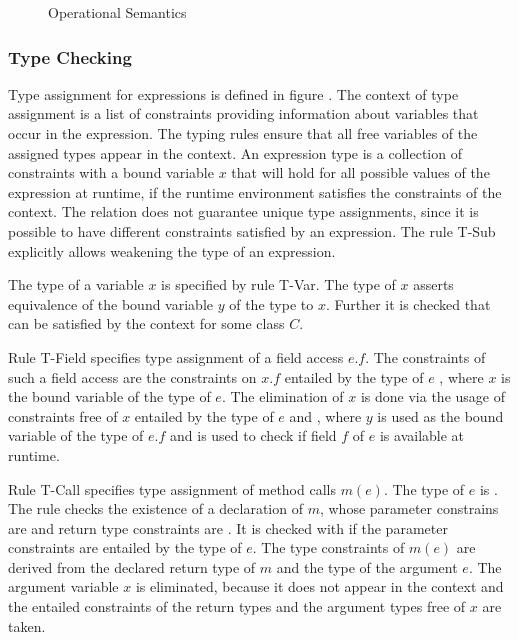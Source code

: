 \begin{figure}
\caption{Operational Semantics}
\label{fig:dcc-opsemantics}
\end{figure}

\subsubsection{Type Checking}
Type assignment for expressions is defined in figure .
The context of type assignment is a list of constraints providing information
about variables that occur in the expression.
The typing rules ensure that all free variables of the assigned types
appear in the context.
An expression type  is a collection of constraints 
with a bound variable $x$
that will hold for all possible values of the expression at runtime,
if the runtime environment satisfies the constraints of the context.
The relation does not guarantee unique type assignments,
since it is possible to have different constraints satisfied by an expression.
The rule T-Sub explicitly allows weakening the type of an expression.

The type of a variable $x$ is specified by rule T-Var.
The type of $x$ asserts equivalence of the bound variable $y$ of the type to $x$.
Further it is checked that  can be satisfied by the context for some class $C$.

Rule T-Field specifies type assignment of a field access $e.f$.
The constraints of such a field access are the constraints on $x.f$
entailed by the type of $e$
, where $x$ is the bound variable of the type of $e$.
The elimination of $x$ is done via the usage of
constraints free of $x$ entailed by the type of $e$ and ,
where $y$ is used as the bound variable of the type of $e.f$
and  is used to check if
field $f$ of $e$ is available at runtime.

Rule T-Call specifies type assignment of method calls $m(e)$.
The type of $e$ is .
The rule checks the existence of a declaration of $m$,
whose parameter constrains are  and return type constraints are .
It is checked with  if
the parameter constraints are entailed by the type of $e$.
The type constraints of $m(e)$ are derived from the declared return type of $m$
and the type of the argument $e$.
The argument variable $x$ is eliminated, because it does not appear in the context
and the entailed constraints of the return types and the argument types
free of $x$ are taken.


